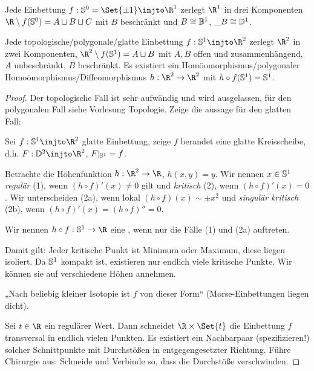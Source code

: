 \begin{nt}
    Jede Einbettung $f: \S^0 = \Set{\pm 1} \injto \R^1$ zerlegt $\R^1$ in drei Komponenten
    \begin{math}
        \R \setminus f(\S^0) = A \sqcup B \sqcup C
    \end{math}
    mit $B$ beschränkt und $B \homeomorphic \B^1$, $\_B \homeomorphic \D^1$.
\end{nt}

\begin{st}
    Jede topologische/polygonale/glatte Einbettung $f: \S^1 \injto \R^2$ zerlegt $\R^2$ in zwei Komponenten, $\R^2 \setminus f(\S^1) = A \sqcup B$ mit $A, B$ offen und zusammenhängend, $A$ unbeschränkt, $B$ beschränkt.
    Es existiert ein Homöomorphismus/polygonaler Homoömorphismus/Diffeomorphismus $h: \R^2 \to \R^2$ mit $h \circ f(\S^1) = \S^1$.
    \begin{proof}
        Der topologische Fall ist sehr aufwändig und wird ausgelassen, für den polygonalen Fall siehe Vorlesung Topologie.
        Zeige die aussage für den glatten Fall:

        Sei $f:\S^1 \injto \R^2$ glatte Einbettung, zeige $f$ berandet eine glatte Kreisscheibe, d.h. $F: \D^2 \injto \R^2$, $F|_{\S^1} = f$.

        Betrachte die Höhenfunktion $h: \R^2 \to \R$, $h(x,y) = y$.
        Wir nennen $x \in \S^1$ \emph{regulär} (1), wenn $(h \circ f)'(x) \neq 0$ gilt und \emph{kritisch} (2), wenn $(h \circ f)'(x) = 0$.
        Wir unterscheiden  (2a), wenn lokal $(h \circ f)(x) \sim \pm x^2$ und \emph{singulär kritisch} (2b), wenn $(h \circ f)'(x) = (h \circ f)'' = 0$.

        Wir nennen $h \circ f: \S^1 \to \R$ eine , wenn nur die Fälle (1) und (2a) auftreten.

        Damit gilt: Jeder kritische Punkt ist Minimum oder Maximum, diese liegen isoliert.
        Da $\S^1$ kompakt ist, existieren nur endlich viele kritische Punkte.
        Wir können sie auf verschiedene Höhen annehmen.
        \begin{st}[Morse]
            „Nach beliebig kleiner Isotopie ist $f$ von dieser Form“ (Morse-Einbettungen liegen dicht).
        \end{st}

        Sei $t \in \R$ ein regulärer Wert.
        Dann schneidet $\R \times \Set{t}$ die Einbettung $f$ transversal in endlich vielen Punkten.
        Es existiert ein Nachbarpaar (spezifizieren!) solcher Schnittpunkte mit Durchstößen in entgegengesetzter Richtung.
        Führe Chirurgie aus: Schneide und Verbinde so, dass die Durchstöße verschwinden.


\end{proof}
\end{st}
